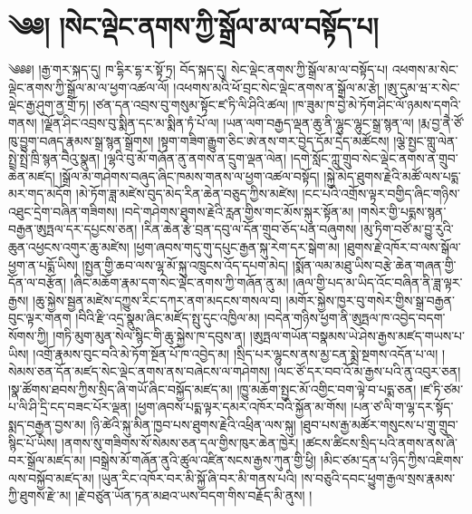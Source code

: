 \setcounter{footnote}{0} 
\chapter{༄༅། །སེང་ལྡེང་ནགས་ཀྱི་སྒྲོལ་མ་ལ་བསྟོད་པ།}༄༅༅། །རྒྱ་གར་སྐད་དུ། ཁ་དྷིར་དྷ་ར་སྟོ་ཏྲ། བོད་སྐད་དུ། སེང་ལྡེང་ནགས་ཀྱི་སྒྲོལ་མ་ལ་བསྟོད་པ། འཕགས་མ་སེང་ལྡེང་ནགས་ཀྱི་སྒྲོལ་མ་ལ་ཕྱག་འཚལ་ལོ། །འཕགས་མའི་ཕོ་བྲང་སེང་ལྡེང་ནགས་ན་སྒྲོལ་མ་རྩེ། །ཨུ་དུམ་ཝ་ར་སེང་ལྡེང་རྒྱ་ཤུག་ནྱ་གྲོ་ཏ། །ཙན་དན་འབྲས་བུ་གསུམ་སྟོང་ཛ་ཏི་ལི་ཤིའི་ཚལ། །ཁ་ཟུམ་ཁ་བྱེ་མེ་ཏོག་ཤིང་ལོ་ཉམས་དགའི་གནས། །ལྗོན་ཤིང་འབྲས་བུ་སྨིན་དང་མ་སྨིན་ཏཾ་པོ་ལ། །ཡན་ལག་བརྒྱད་ལྡན་ཆུ་ནི་ལྷུང་ལྷུང་སྒྲ་སྙན་ལ། །རྨ་བྱ་ནཻ་ཙོ་ཁུ་བྱུག་བཞད་རྣམས་སྒྲ་སྙན་སྒྲོགས། །སྟག་གཟིག་རྒྱུག་ཅིང་ཨེ་ནས་གར་བྱེད་དོམ་དྲེད་མཚོངས། །ལྕེ་སྤྱང་གླུ་ལེན་སྤྲེ་སྤྲེ་ཁྲི་སྙན་བཻའུ་སྣུན། །ལྷའི་བུ་མོ་གཞོན་ནུ་ནགས་ན་དྲུག་ལྡན་ལེན། །དགེ་སློང་ཀླུ་གྲུབ་སེང་ལྡེང་ནགས་ན་གྲུབ་ཆེན་མཛད། །སྒྲོལ་མ་གཤེགས་བཞུད་ཞིང་ཁམས་གནས་ལ་ཕྱག་འཚལ་བསྟོད། །སྐྱེ་མེད་ཐུགས་རྗེའི་མཚོ་ལས་པདྨ་མར་གད་མདོག །མེ་ཏོག་ཟླ་མཛེས་བུད་མེད་རིན་ཆེན་བཅུད་ཀྱིས་མཛེས། །ངང་པའི་འགྲོས་ལྟར་བགྱིད་ཞིང་གཉིས་འཐུང་དྲེག་བཞིན་གཟིགས། །བདེ་གཤེགས་ཐུགས་རྗེའི་རླན་གྱིས་གང་མོས་སྐུར་སྟོན་མ། །གསེར་གྱི་པདྨས་སྙན་བརྒྱན་ཨུཏྤལ་དར་དཔྱངས་ཅན། །རིན་ཆེན་རྩེ་བྲན་དབུ་ལ་དོན་གྲུབ་ཅོད་པན་བཞུགས། །མུ་ཏིག་བཙོ་མ་བྱུ་རུའི་ཆུན་འཕྱངས་འགུར་ཆུ་མཛེས། །ཕྱག་ཞབས་གདུ་གུ་དཔུང་རྒྱན་སྐུ་རེག་དར་སྒེག་མ། །ཐུགས་རྗེ་འཁོར་བ་ལས་སྒོལ་ཕྱག་ན་པདྨོ་ཡིས། །སྤྱན་གྱི་ཆབ་ལས་ལྷ་མོ་སྐུ་འཁྲུངས་འོད་དཔག་མེད། །སྨོན་ལམ་མཐུ་ཡིས་བརྩེ་ཆེན་གཞན་གྱི་དོན་ལ་བརྩོན། །ཞིང་མཆོག་རྣམ་དག་སེང་ལྡེང་ནགས་ཀྱི་གཞོན་ནུ་མ། །ཞལ་གྱི་པད་མ་ཡིད་འོང་བཞིན་ནི་ཟླ་ལྟར་རྒྱས། །ཆུ་སྐྱེས་སྦྱན་མཛེས་དཀྱུས་རིང་དཀར་ནག་མདངས་གསལ་བ། །མགོར་སྐྱེས་ཁྱར་བུ་གསེར་གྱིས་སྒྲ་བརྒྱན་བུང་ལྟར་གནག །བིའི་རྫི་འདྲ་སྣུམ་ཞིང་མཛོད་སྤུ་དུང་འཁྱིལ་མ། །བདེན་གཉིས་ཕྱག་ནི་ཨུཏྤལ་ཁ་འབྱེད་བདག་སོགས་ཀྱི། །གཏི་མུག་མུན་སེལ་སྙིང་གི་ཆུ་སྐྱེས་ཁ་དབུས་ན། །ཨུཏྤལ་གཡོན་བསྣམས་ཡེ་ཤེས་རྒྱས་མཛད་གཡས་པ་ཡིས། །འགྲོ་རྣམས་བུང་བའི་མེ་ཏོག་སྔོན་པོ་ཁ་འབྱེད་མ། །སྲིད་པར་ལྷུངས་ནས་མྱ་ངན་སྨྲེ་སྔགས་འདོན་པ་ལ། །སེམས་ཅན་དོན་མཛད་སེང་ལྡེང་ནགས་ནས་བཞེངས་ལ་གཤེགས། །ལང་ཙོ་དར་བབ་འོ་མ་རྒྱས་པའི་ནུ་འབུར་ཅན། །སྣ་ཚོགས་ཐབས་ཀྱིས་སྲིད་ཞི་གཡོ་ཞིང་བསྐྱོད་མཛད་མ། །ཁྱུ་མཆོག་སྤྱང་མོ་འགྱིང་བག་ལྟེ་བ་པདྨ་ཅན། །ཛ་ཏི་ཙམ་པ་ལི་ཤི་དྲི་ངད་བཟང་པོར་ལྡན། །ཕྱག་ཞབས་པདྨ་ལྟར་དམར་འཁོར་བའི་སྐྱོན་མ་གོས། །པན་ཙ་ལི་ག་ལྷ་དར་སྟོད་སྨད་བརྒྱན་བྱས་མ། །ཉི་ཚེའི་སྐུ་མིན་ཁྱབ་པས་ཐུགས་རྗེའི་འཕྲིན་ལས་སྐུ། །ཐུབ་པས་རྒྱ་མཚོར་གསུངས་པ་གྲུ་གྲུབ་སྙིང་པོ་ཡིས། །ནགས་སུ་གཟིགས་སོ་སེམས་ཅན་དལ་གྱིས་ཁུར་ཆེན་ཁྱེར། །ཚངས་ཚིངས་སྲིད་པའི་ནགས་ནས་ཞི་བར་སྒྲོལ་མཛད་མ། །བསྒྲེས་མོ་གཞོན་ནུའི་ཚུལ་འཛིན་སངས་རྒྱས་ཀུན་གྱི་ཕྱི། །མིང་ཙམ་དྲན་པ་ཉིད་ཀྱིས་འཇིགས་ལས་བསྐྱོབ་མཛད་མ། །ཡུན་རིང་འཁོར་བར་མི་སྐྱོ་ཞི་བར་མི་གནས་པའི། །ས་བཅུའི་དབང་ཕྱུག་རྒྱལ་སྲས་རྣམས་ཀྱི་ཐུགས་རྫེ་མ། །རྗེ་བཙུན་ཡོན་ཏན་མཐའ་ཡས་བདག་གིས་བརྗོད་མི་ནུས། །
